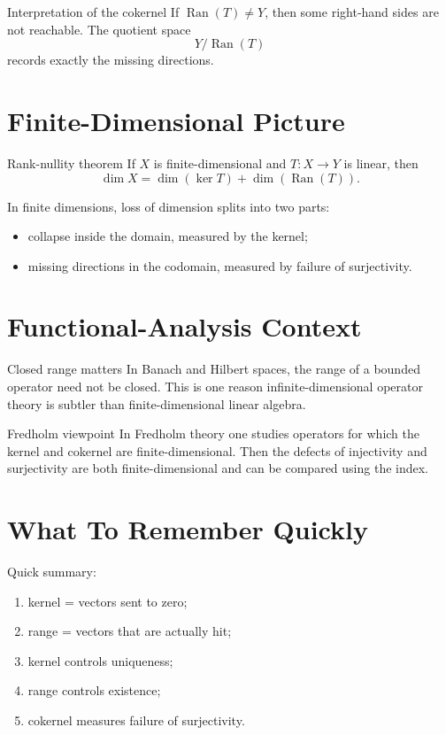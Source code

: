 \documentclass[header={Ancillary Note: Kernel And Range},notheorems]{study-note}
\begin{document}
\begin{exbox}{Interpretation of the cokernel}
If $\operatorname{Ran}(T)\neq Y$, then some right-hand sides are not reachable. The quotient space
\[
Y/\operatorname{Ran}(T)
\]
records exactly the missing directions.
\end{exbox}

\section{Finite-Dimensional Picture}

\begin{thmbox}{Rank-nullity theorem}
If $X$ is finite-dimensional and $T:X\to Y$ is linear, then
\[
\dim X=\dim(\ker T)+\dim(\operatorname{Ran}(T)).
\]
\end{thmbox}

\begin{focusbox}
In finite dimensions, loss of dimension splits into two parts:
\begin{itemize}
\item collapse inside the domain, measured by the kernel;
\item missing directions in the codomain, measured by failure of surjectivity.
\end{itemize}
\end{focusbox}

\section{Functional-Analysis Context}

\begin{warningbox}{Closed range matters}
In Banach and Hilbert spaces, the range of a bounded operator need not be closed. This is one reason infinite-dimensional operator theory is subtler than finite-dimensional linear algebra.
\end{warningbox}

\begin{exbox}{Fredholm viewpoint}
In Fredholm theory one studies operators for which the kernel and cokernel are finite-dimensional. Then the defects of injectivity and surjectivity are both finite-dimensional and can be compared using the index.
\end{exbox}

\section{What To Remember Quickly}

\begin{focusbox}
Quick summary:
\begin{enumerate}
\item kernel = vectors sent to zero;
\item range = vectors that are actually hit;
\item kernel controls uniqueness;
\item range controls existence;
\item cokernel measures failure of surjectivity.
\end{enumerate}
\end{focusbox}
\end{document}

